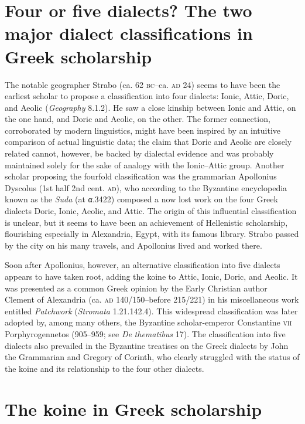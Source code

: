 \section{Four or five dialects? The two major dialect classifications in Greek scholarship}

The notable geographer Strabo (ca. 62 \textsc{bc–}ca. \textsc{ad} 24) seems to have been the earliest scholar to propose a classification into four dialects: Ionic, Attic, Doric, and Aeolic (\textit{Geography} 8.1.2). He saw a close kinship between Ionic and Attic, on the one hand, and Doric and Aeolic, on the other. The former connection, corroborated by modern linguistics, might have been inspired by an intuitive comparison of actual linguistic data; the claim that Doric and Aeolic are closely related cannot, however, be backed by dialectal evidence and was probably maintained solely for the sake of analogy with the Ionic–Attic group. Another scholar proposing the fourfold classification was the grammarian Apollonius Dyscolus (1st half 2nd cent. \textsc{ad}), who according to the Byzantine encyclopedia known as the \textit{Suda} (at α.3422) composed a now lost work on the four Greek dialects Doric, Ionic, Aeolic, and Attic. The origin of this influential classification is unclear, but it seems to have been an achievement of Hellenistic scholarship, flourishing especially in Alexandria, Egypt, with its famous library. Strabo passed by the city on his many travels, and Apollonius lived and worked there.

Soon after Apollonius, however, an alternative classification into five dialects appears to have taken root, adding the koine to Attic, Ionic, Doric, and Aeolic. It was presented as a common Greek opinion by the Early Christian author Clement of Alexandria (ca. \textsc{ad} 140/150–before 215/221) in his miscellaneous work entitled \textit{Patchwork} (\textit{Stromata} 1.21.142.4). This widespread classification was later adopted by, among many others, the Byzantine scholar-emperor Constantine \textsc{vii} Porphyrogennetos (905–959; see \textit{De} \textit{thematibus} 17). The classification into five dialects also prevailed in the Byzantine treatises on the Greek dialects by John the Grammarian and Gregory of Corinth, who clearly struggled with the status of the koine and its relationship to the four other dialects.

\section{The koine in Greek scholarship}

